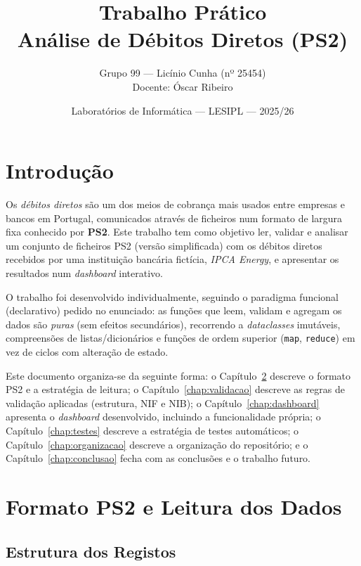 \documentclass[11pt,a4paper]{report}
\title{Trabalho Prático\\\large Análise de Débitos Diretos (PS2)}
\author{Grupo 99 --- Licínio Cunha (nº 25454) \\[1.5em] Docente: Óscar Ribeiro}
\date{Laboratórios de Informática --- LESIPL --- 2025/26}
\begin{document}
\maketitle

\tableofcontents
\listoffigures
\listoftables
\lstlistoflistings

\clearpage
\chapter{Introdução}

Os \emph{débitos diretos} são um dos meios de cobrança mais usados entre
empresas e bancos em Portugal, comunicados através de ficheiros num formato
de largura fixa conhecido por \textbf{PS2}. Este trabalho tem como objetivo
ler, validar e analisar um conjunto de ficheiros PS2 (versão simplificada)
com os débitos diretos recebidos por uma instituição bancária fictícia,
\textit{IPCA Energy}, e apresentar os resultados num \emph{dashboard}
interativo.

O trabalho foi desenvolvido individualmente, seguindo o paradigma funcional
(declarativo) pedido no enunciado: as funções que leem, validam e agregam os
dados são \emph{puras} (sem efeitos secundários), recorrendo a
\textit{dataclasses} imutáveis, compreensões de listas/dicionários e funções
de ordem superior (\texttt{map}, \texttt{reduce}) em vez de ciclos com
alteração de estado.

Este documento organiza-se da seguinte forma: o Capítulo~\ref{chap:formato}
descreve o formato PS2 e a estratégia de leitura; o
Capítulo~\ref{chap:validacao} descreve as regras de validação aplicadas
(estrutura, NIF e NIB); o Capítulo~\ref{chap:dashboard} apresenta o
\textit{dashboard} desenvolvido, incluindo a funcionalidade própria; o
Capítulo~\ref{chap:testes} descreve a estratégia de testes automáticos; o
Capítulo~\ref{chap:organizacao} descreve a organização do repositório; e o
Capítulo~\ref{chap:conclusao} fecha com as conclusões e o trabalho futuro.

\chapter{Formato PS2 e Leitura dos Dados}
\label{chap:formato}

\section{Estrutura dos Registos}
\end{document}

